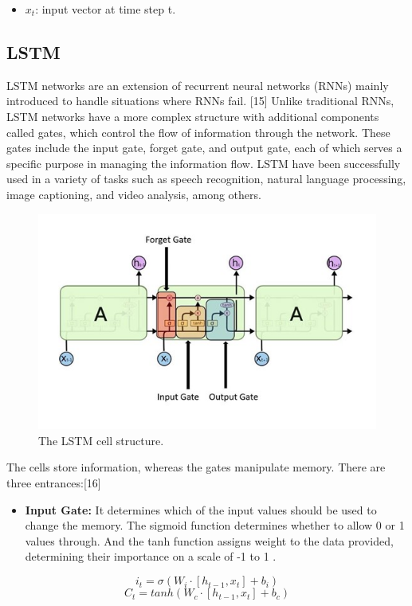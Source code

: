 \documentclass{ieeeojies}
\begin{document}
\begin{itemize}
    \item\(x_t\): input vector at time step t.
\end{itemize}


\subsection{LSTM}
LSTM networks are an extension of recurrent neural networks (RNNs) mainly introduced to handle situations where RNNs fail. [15] Unlike traditional RNNs, LSTM networks have a more complex structure with additional components called gates, which control the flow of information through the network. These gates include the input gate, forget gate, and output gate, each of which serves a specific purpose in managing the information flow. LSTM have been successfully used in a variety of tasks such as speech recognition, natural language processing, image captioning, and video analysis, among others. 
 \begin{figure}[H]
    \centering
    \begin{minipage}{0.50\textwidth}
    \centering
    \includegraphics[width=1\textwidth]{The LSTM structure.jpg}
    \caption{The LSTM cell structure.}
    \label{fig:1}
    \end{minipage}
\end{figure}
The cells store information, whereas the gates manipulate memory. There are three entrances:[16]
\begin{itemize}
    \item  \textbf{Input Gate:}  It determines which of the input values should be used to change the memory. The sigmoid function determines whether to allow 0 or 1 values through. And the tanh function assigns weight to the data provided, determining their importance on a scale of -1 to 1 . 
\end{itemize}
\[i_t = \sigma(W_i \cdot [h_{t-1}, x_t] + b_i)\]
\[C_t = tanh(W_c \cdot [h_{t-1}, x_t] + b_c)\]
\end{document}
